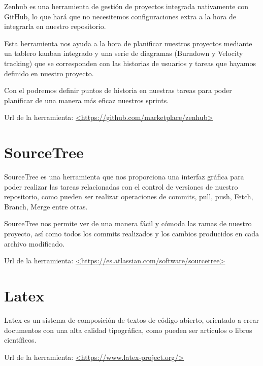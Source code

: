 Zenhub es una herramienta de gestión de proyectos integrada nativamente con GitHub, lo que hará que no necesitemos configuraciones extra a la hora de integrarla en nuestro repositorio. 

Esta herramienta nos ayuda a la hora de planificar nuestros proyectos mediante un tablero kanban integrado y una serie de diagramas (Burndown y Velocity tracking) que se corresponden con las historias de usuarios y tareas que hayamos definido en nuestro proyecto.

Con el podremos definir puntos de historia en nuestras tareas para poder planificar de una manera más eficaz nuestros sprints.

Url de la herramienta: \url{<https://github.com/marketplace/zenhub>}

\section{SourceTree}

SourceTree es una herramienta que nos proporciona una interfaz gráfica para poder realizar las tareas relacionadas con el control de versiones de nuestro repositorio, como pueden ser realizar  operaciones de commits, pull, push, Fetch, Branch, Merge entre otras.

SourceTree nos permite ver de una manera fácil y cómoda las ramas de nuestro proyecto, así como todos los commits realizados y los cambios producidos en cada archivo modificado.

Url de la herramienta: \url{<https://es.atlassian.com/software/sourcetree>}

\section{Latex}

Latex es un sistema de composición de textos de código abierto, orientado a crear documentos con una alta calidad tipográfica, como pueden ser artículos o libros científicos.\cite{wiki:Latex}

Url de la herramienta: \url{<https://www.latex-project.org/>}



